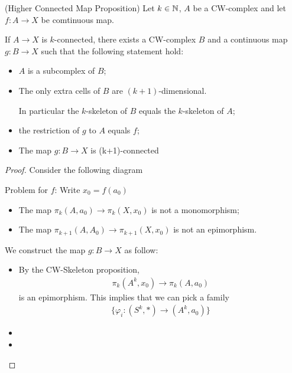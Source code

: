 \documentclass[Total.tex]{subfiles}
\begin{document}
	\begin{proposition}
		(Higher Connected Map Proposition) Let $k\in \mathbb{N}$, $A$ be a CW-complex and let $f:A\rightarrow X$ be comtinuous map.
		
		If $A\rightarrow X$ is $k$-connected, there exists a CW-complex $B$ and a continuous map $g:B\rightarrow X$ such that the following statement hold:
		\begin{itemize}
			\item $A$ is a subcomplex of $B$;
			\item The only extra cells of $B$ are $(k+1)$-dimensional.
			
			In particular the $k$-skeleton of $B$ equals the $k$-skeleton of $A$;
			\item the restriction of $g$ to $A$ equals $f$;
			\item The map $g:B\rightarrow X$ is (k+1)-connected
		\end{itemize}
	\end{proposition}
		\begin{proof}
			Consider the following diagram
			\begin{center}
			\end{center}
			Problem for $f$: Write $x_0=f(a_0)$
			\begin{itemize}
				\item The map $\pi_k(A,a_0)\rightarrow \pi_k(X,x_0)$ is not a monomorphism;
				\item The map $\pi_{k+1}(A,A_0)\rightarrow \pi_{k+1}(X,x_0)$ is not an epimorphism.
			\end{itemize}
			We construct the map $g:B\rightarrow X$ as follow:
			\begin{itemize}
				\item By the CW-Skeleton proposition,
				\begin{gather*}
					\pi_k(A^k,x_0)\rightarrow \pi_k(A,a_0)
				\end{gather*}
				is an epimorphism. This implies that we can pick a family
				\begin{gather*}
					\{\varphi_i:(S^k,*)\rightarrow (A^k,a_0)\}
				\end{gather*}
				\item 
				\item 
			\end{itemize}
		\end{proof}
\end{document}
